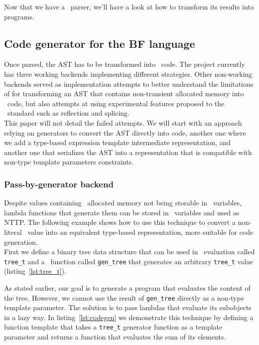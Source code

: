 \documentclass[../../main.tex]{subfiles}
\begin{document}
Now that we have a \constexpr~parser, we'll have a look at how to transform its
results into programs.

\subsection{Code generator for the BF language}

Once parsed, the AST has to be transformed into \cpp~code. The project currently
has three working backends implementing different strategies. Other
non-working backends served as implementation attempts to better understand the
limitations of  for transforming an AST that contains non-transient
allocated memory into \cpp~code, but also attempts at using experimental
features proposed to the \cpp~standard such as reflection and
splicing\cite{scalable-reflection}.\\

This paper will not detail the failed attempts. We will start with an approach
relying on generators to convert the AST directly into code, another one where
we add a type-based expression template intermediate representation, and another
one that serializes the AST into a representation that is compatible with
non-type template parameters constraints.

\subsubsection{Pass-by-generator backend}

Despite values containing \constexpr~allocated memory not being storable in
\constexpr~variables, lambda functions that generate them can be stored in
\constexpr~variables and used as NTTP. The following example shows how to use
this technique to convert a non-literal \constexpr~value into an equivalent
type-based representation, more suitable for code generation.\\

First we define a binary tree data structure that can be used in
\constexpr~evaluation called \lstinline|tree_t| and a
\constexpr~function called \lstinline|gen_tree| that generates an arbitrary
\lstinline|tree_t| value (listing~\ref{lst:tree_t}).



As stated earlier, our goal is to generate a program that evaluates the content
of the tree. However, we cannot use the result of \lstinline|gen_tree| directly
as a non-type template parameter. The solution is to pass lambdas that evaluate
its subobjects in a lazy way. In listing~\ref{lst:codegen} we demonstrate this
technique by defining a function template that takes a \lstinline|tree_t|
generator function as a template parameter and returns a function that evaluates
the sum of its elements.\\
\end{document}
